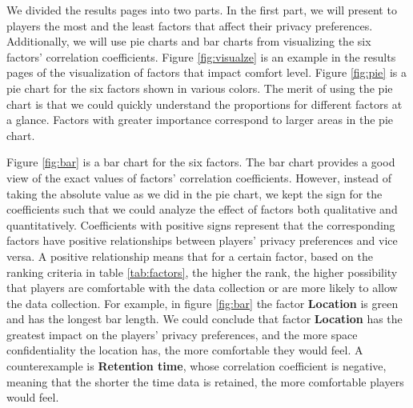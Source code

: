 \documentclass[msc,deptreport,ai]{infthesis}      %
\begin{document}
We divided the results pages into two parts. In the first part, we will present to players the most and the least factors that affect their privacy preferences. Additionally, we will use pie charts and bar charts from visualizing the six factors' correlation coefficients. Figure \ref{fig:visualze} is an example in the results pages of the visualization of factors that impact comfort level. Figure \ref{fig:pie} is a pie chart for the six factors shown in various colors. The merit of using the pie chart is that we could quickly understand the proportions for different factors at a glance. Factors with greater importance correspond to larger areas in the pie chart.

Figure \ref{fig:bar} is a bar chart for the six factors. The bar chart provides a good view of the exact values of factors' correlation coefficients. However, instead of taking the absolute value as we did in the pie chart, we kept the sign for the coefficients such that we could analyze the effect of factors both qualitative and quantitatively. Coefficients with positive signs represent that the corresponding factors have positive relationships between players' privacy preferences and vice versa. A positive relationship means that for a certain factor, based on the ranking criteria in table \ref{tab:factors}, the higher the rank, the higher possibility that players are comfortable with the data collection or are more likely to allow the data collection. For example, in figure \ref{fig:bar} the factor \textbf{Location} is green and has the longest bar length. We could conclude that factor \textbf{Location} has the greatest impact on the players' privacy preferences, and the more space confidentiality the location has, the more comfortable they would feel. A counterexample is \textbf{Retention time}, whose correlation coefficient is negative, meaning that the shorter the time data is retained, the more comfortable players would feel.
\end{document}
